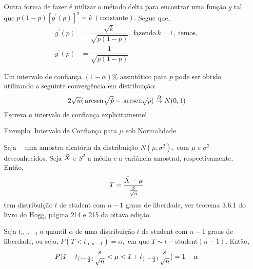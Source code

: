 \documentclass[12pt]{beamer}
\begin{document}
\begin{frame}{}
\begin{block}{}
\justifying
Outra forma de fazer é utilizar o método delta para encontrar uma função $g$ tal que $p(1-p)[g^{'}(p)]^{2}=k~(\text{constante}).$ Segue que,
\begin{align*}
g^{'}(p)&=\dfrac{\sqrt{k}}{\sqrt{p(1-p)}},~\text{fazendo}~k=1,~\text{temos},\\
g^{'}(p)&=\dfrac{1}{\sqrt{p(1-p)}}
\end{align*}
\end{block}
\end{frame}

\begin{frame}{\Home}
\begin{block}{}
\justifying
Um intervalo de confiança $(1-\alpha)\%$ assintótico para $p$ pode ser obtido utilizando a seguinte convergência em distribuição:
\begin{align*}
    2\sqrt{n}(\hspace{2pt}\textrm{arcsen}{\sqrt{\hat{p}}}-\hspace{2pt}\textrm{arcsen}{\sqrt{p}})\overset{D}{\rightarrow} N(0,1)
\end{align*}
Escreva o intervalo de confiança explicitamente!
\end{block}
\end{frame}

\begin{frame}{Exemplo: Intervalo de Confiança para $\mu$ sob Normalidade}
\begin{block}{}
\justifying
Seja \seqX~ uma amostra aleatória da distribuição $N(\mu,\sigma^{2}),$ com $\mu$ e $\sigma^{2}$ desconhecidos. Seja $\Bar{X}$ e $S^{2}$ a média e a variância amostral, respectivamente. Então,
$$T=\dfrac{\Bar{X}-\mu}{\frac{S}{\sqrt{n}}}$$
tem distribuição $t$ de student com $n-1$ graus de liberdade, ver teorema 3.6.1 do livro do Hogg, página 214 e 215 da oitava edição.
\end{block}
\end{frame}

\begin{frame}{}
\begin{block}{}
\justifying
Seja $t_{\alpha,n-1}$ o quantil $\alpha$ de uma distribuição $t$ de student com $n-1$ graus de liberdade, ou seja, $P(T<t_{\alpha,n-1})=\alpha,$ em que $T\sim t-$student$(n-1).$ Então,
\begin{align*}
    P(\Bar{x}-t_{(1-\frac{\alpha}{2})}\dfrac{s}{\sqrt{n}}<\mu<\Bar{x}+t_{(1-\frac{\alpha}{2})}\dfrac{s}{\sqrt{n}})=1-\alpha
\end{align*}
\end{block}
\end{frame}
\end{document}
